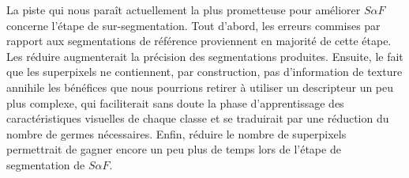 La piste qui nous paraît actuellement la plus prometteuse pour améliorer $S \alpha F$ concerne l'étape de sur-segmentation. Tout d'abord, les erreurs commises par rapport aux segmentations de référence proviennent en majorité de cette étape. Les réduire augmenterait la précision des segmentations produites. Ensuite, le fait que les superpixels  ne contiennent, par construction, pas d'information de texture annihile les bénéfices que nous pourrions retirer à utiliser un descripteur un peu plus complexe, qui faciliterait sans doute la phase d'apprentissage des caractéristiques visuelles de chaque classe et se traduirait  par une réduction du nombre de germes nécessaires. Enfin, réduire le nombre de superpixels permettrait de gagner encore un peu plus de temps lors de l'étape de segmentation de $S \alpha F$. 
